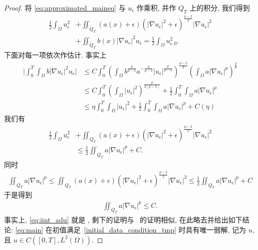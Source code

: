 \documentclass[oneside,longtitle]{LZUthesis}
\theoremstyle{definition}
\numberwithin{equation}{chapter}
\newcommand*\abs[1]{\lvert#1\rvert}
\begin{document}
\begin{proof}
	将 \cref{eq:approximated_maineq} 与 $u_\epsilon$ 作乘积, 并作 $Q_T$ 上的积分, 我们得到
	\begin{equation}
		\begin{split}
			\frac{1}{2} \int_{\Omega} u_{\epsilon}^{2}
			&+\iint_{Q_{T}}(a(x)+\epsilon)\left(\left|\nabla u_{\epsilon}\right|^{2}+\epsilon\right)^{\frac{p-2}{2}}\left|\nabla u_{\epsilon}\right|^{2}\\
			&+\iint_{Q_{T}} b(x)\left|\nabla u_{\epsilon}\right|^{2} u_{\epsilon}  =\frac{1}{2} \int_{\Omega} u_{\epsilon, 0}^{2}.
		\end{split}
	\end{equation}
	下面对每一项依次作估计. 事实上
	\begin{equation}
		\begin{split}
			\abs{\int_0^T\int_{\Omega} b\abs{\nabla u_{\epsilon}}^2u_{\epsilon}}
			&\leq C\int_0^T\left( \int_{\Omega} b^{\frac{p}{p-2}}a^{-\frac{2}{p-2}}\abs{u_{\epsilon}}^{\frac{p}{p-2}} \right)^{\frac{p-2}{p}}
			\left(  \int_{\Omega} a\abs{\nabla u_{\epsilon}}^p \right)^{\frac{2}{p}}\\
			&\leq C\int_0^T\left(\int_{\Omega}\abs{u_{\epsilon}}^2\right)^{\frac{p}{2(p-2)}} + \frac{1}{2}\int_0^T\int_{\Omega} a\abs{\nabla u_{\epsilon}}^p\\
			&\leq \eta\int_0^T\int_{\Omega}\abs{u_{\epsilon}}^2 + \frac{1}{2}\int_0^T\int_{\Omega} a\abs{\nabla u_{\epsilon}}^p + C(\eta)
		\end{split}
	\end{equation}
	我们有
	\begin{equation}
		\begin{split}
			\frac{1}{2} \int_{\Omega} u_{\epsilon}^{2}
			&+\iint_{Q_{T}}(a(x)+\epsilon)\left(\left|\nabla u_{\epsilon}\right|^{2}+\epsilon\right)^{\frac{p-2}{2}}\left|\nabla u_{\epsilon}\right|^{2}\\
			&\leq \frac{1}{2}\iint_{Q_T}a\abs{\nabla u_\epsilon}^p + C.
		\end{split}
	\end{equation}
	同时
	\begin{equation}
		\begin{split}
			\iint_{Q_T}a\abs{\nabla u_\epsilon}^p
			\leq \iint_{Q_{T}}(a(x)+\epsilon)\left(\left|\nabla u_{\epsilon}\right|^{2}+\epsilon\right)^{\frac{p-2}{2}}\left|\nabla u_{\epsilon}\right|^{2}
			\leq \frac{1}{2}\iint_{Q_T}a\abs{\nabla u_\epsilon}^p + C
		\end{split}
	\end{equation}
	于是得到
	\begin{equation}\label{eq:iint_adu}
		\begin{split}
			\iint_{Q_T}a\abs{\nabla u_\epsilon}^p \leq C.
		\end{split}
	\end{equation}
	事实上, \cref{eq:iint_adu} 就是 \cite[定理 1.3 式(2.5)]{Zhan2019Uniquenessa},
	剩下的证明与~\cite[定理 1.3]{Zhan2019Uniquenessa} 的证明相似, 在此略去并给出如下结论:
	\cref{eq:main} 在初值满足~\eqref{initial_data_condition_tmp} 时具有唯一弱解, 记为 $u$,
	且 $u \in C([0, T], L^2(\Omega))$.


\end{proof}
\end{document}
